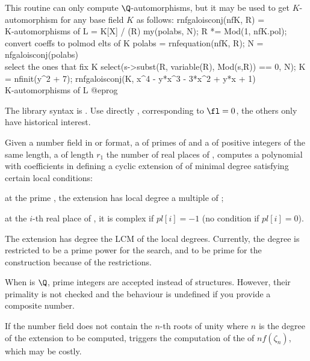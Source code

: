 This routine can only compute $\Q$-automorphisms, but it may be used to get
$K$-automorphism for any base field $K$ as follows:
\bprog
rnfgaloisconj(nfK, R) = \\ K-automorphisms of L = K[X] / (R)
{ my(polabs, N);
  R *= Mod(1, nfK.pol);             \\ convert coeffs to polmod elts of K
  polabs = rnfequation(nfK, R);
  N = nfgaloisconj(polabs) %
  \\ select the ones that fix K
  select(s->subst(R, variable(R), Mod(s,R)) == 0, N);
}
K  = nfinit(y^2 + 7);
rnfgaloisconj(K, x^4 - y*x^3 - 3*x^2 + y*x + 1)  \\ K-automorphisms of L
@eprog

The library syntax is .
Use directly
, corresponding to $\fl = 0$, the others
only have historical interest.

\label{se:nfgrunwaldwang}
Given  a number field in  or  format,
a   of primes of  and a   of
positive integers of the same length, a   of length
$r_1$ the number of real places of , computes a polynomial with
coefficients in  defining a cyclic extension of  of
minimal degree satisfying certain local conditions:

\item at the prime , the extension has local degree a multiple of
;

\item at the $i$-th real place of , it is complex if $pl[i]=-1$
(no condition if $pl[i]=0$).

The extension has degree the LCM of the local degrees. Currently, the degree
is restricted to be a prime power for the search, and to be prime for the
construction because of the  restrictions.

When  is $\Q$, prime integers are accepted instead of 
structures. However, their primality is not checked and the behaviour is
undefined if you provide a composite number.

 If the number field  does not contain the $n$-th
roots of unity where $n$ is the degree of the extension to be computed,
triggers the computation of the  of $nf(\zeta_n)$, which may be
costly.

